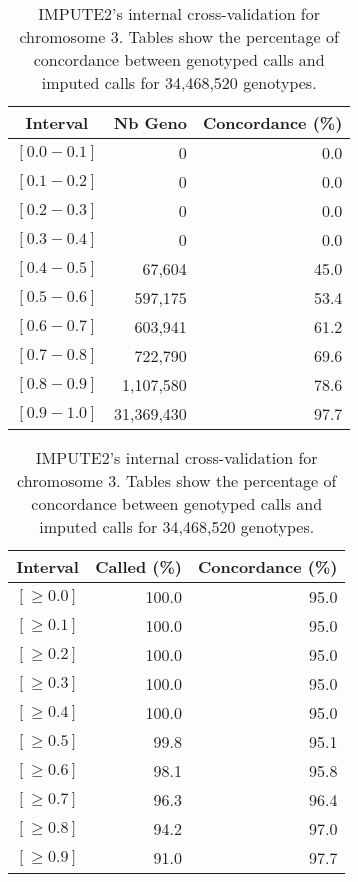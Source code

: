 \documentclass[10pt,twoside,english]{scrartcl}
\begin{document}
\begin{table}[H]
\protect\caption{IMPUTE2's internal cross-validation for chromosome 3. Tables show the
percentage of concordance between genotyped calls and imputed calls
for 34,468,520 genotypes.\label{tab:cross_validation_chr_3}}

\centering

\begin{tabular}{crr}
\hline 
\multicolumn{1}{c}{\textbf{Interval}}
 & \multicolumn{1}{c}{\textbf{Nb Geno}}
 & \multicolumn{1}{c}{\textbf{Concordance (\%)}}
\\
\hline 

$[0.0-0.1]$ & 0 & 0.0\\
$[0.1-0.2]$ & 0 & 0.0\\
$[0.2-0.3]$ & 0 & 0.0\\
$[0.3-0.4]$ & 0 & 0.0\\
$[0.4-0.5]$ & 67,604 & 45.0\\
$[0.5-0.6]$ & 597,175 & 53.4\\
$[0.6-0.7]$ & 603,941 & 61.2\\
$[0.7-0.8]$ & 722,790 & 69.6\\
$[0.8-0.9]$ & 1,107,580 & 78.6\\
$[0.9-1.0]$ & 31,369,430 & 97.7\\
\hline 
\end{tabular}
\hfill
\begin{tabular}{crr}
\hline 
\multicolumn{1}{c}{\textbf{Interval}}
 & \multicolumn{1}{c}{\textbf{Called (\%)}}
 & \multicolumn{1}{c}{\textbf{Concordance (\%)}}
\\
\hline 

$[\geq 0.0]$ & 100.0 & 95.0\\
$[\geq 0.1]$ & 100.0 & 95.0\\
$[\geq 0.2]$ & 100.0 & 95.0\\
$[\geq 0.3]$ & 100.0 & 95.0\\
$[\geq 0.4]$ & 100.0 & 95.0\\
$[\geq 0.5]$ & 99.8 & 95.1\\
$[\geq 0.6]$ & 98.1 & 95.8\\
$[\geq 0.7]$ & 96.3 & 96.4\\
$[\geq 0.8]$ & 94.2 & 97.0\\
$[\geq 0.9]$ & 91.0 & 97.7\\
\hline 
\end{tabular}


\end{table}
\end{document}
